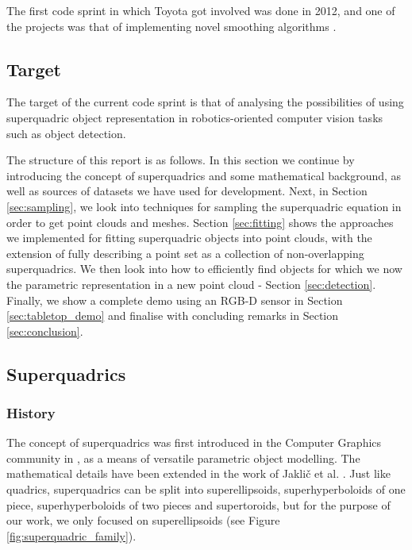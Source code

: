 \documentclass{article}
\begin{document}
The first code sprint in which Toyota got involved was done in 2012, and one of the projects was that of implementing novel smoothing algorithms \cite{tocs_final_report}.

\subsection {Target}
The target of the current code sprint is that of analysing the possibilities of using superquadric object representation in robotics-oriented computer vision tasks such as object detection. 

The structure of this report is as follows. In this section we continue by introducing the concept of superquadrics and some mathematical background, as well as sources of datasets we have used for development. Next, in Section \ref{sec:sampling}, we look into techniques for sampling the superquadric equation in order to get point clouds and meshes. Section \ref{sec:fitting} shows the approaches we implemented for fitting superquadric objects into point clouds, with the extension of fully describing a point set as a collection of non-overlapping superquadrics. We then look into how to efficiently find objects for which we now the parametric representation in a new point cloud - Section \ref{sec:detection}. Finally, we show a complete demo using an RGB-D sensor in Section \ref{sec:tabletop_demo} and finalise with concluding remarks in Section \ref{sec:conclusion}.


\subsection {Superquadrics}

\subsubsection*{History}
The concept of superquadrics was first introduced in the Computer Graphics community in \cite{1673799}, as a means of versatile parametric object modelling. The mathematical details have been extended in the work of Jakli\v{c} et al. \cite{SQ_2000}. Just like quadrics, superquadrics can be split into superellipsoids, superhyperboloids of one piece, superhyperboloids of two pieces and supertoroids, but for the purpose of our work, we only focused on superellipsoids (see Figure \ref{fig:superquadric_family}).
\end{document}
